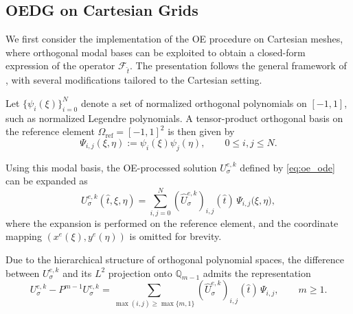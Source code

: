 \documentclass[fleqn,11pt]{amsart}
\newtheorem{remark}{Remark}[section]
\begin{document}

\subsection{OEDG on Cartesian Grids}

We first consider the implementation of the OE procedure on Cartesian
meshes, where orthogonal modal bases can be exploited to obtain a
closed-form expression of the operator $\mathcal F_{\hat t}$.
The presentation follows the general framework of
\cite{peng2025oedg}, with several modifications tailored to the
Cartesian setting.

Let $\{\psi_i(\xi)\}_{i=0}^N$ denote a set of normalized orthogonal
polynomials on $[-1,1]$, such as normalized Legendre polynomials.
A tensor-product orthogonal basis on the reference element
$\Omega_{\mathrm{ref}}=[-1,1]^2$ is then given by
\[
\Psi_{i,j}(\xi,\eta) := \psi_i(\xi)\psi_j(\eta),
\qquad 0 \le i,j \le N.
\]

Using this modal basis, the OE-processed solution
$U_{\sigma}^{e,k}$ defined by \eqref{eq:oe_ode} can be expanded as
\begin{equation}
\label{eq:oe_modal_expansion}
U_{\sigma}^{e,k}(\hat t,\xi,\eta)
=
\sum_{i,j=0}^N
(\hat U_{\sigma}^{e,k})_{i,j}(\hat t)\,
\Psi_{i,j}\bigl(\xi,\eta\bigr),
\end{equation}
where the expansion is performed on the reference element, and the
coordinate mapping $(x^e(\xi),y^e(\eta))$ is omitted for brevity.

Due to the hierarchical structure of orthogonal polynomial spaces,
the difference between $U_{\sigma}^{e,k}$ and its $L^2$ projection
onto $\mathbb Q_{m-1}$ admits the representation
\begin{equation}
\label{eq:oe_modal_truncation}
U_{\sigma}^{e,k} - P^{m-1} U_{\sigma}^{e,k}
=
\sum_{\max(i,j)\ge \max\{m,1\}}
(\hat U_{\sigma}^{e,k})_{i,j}(\hat t)\,
\Psi_{i,j},
\qquad m \ge 1.
\end{equation}
\end{document}
